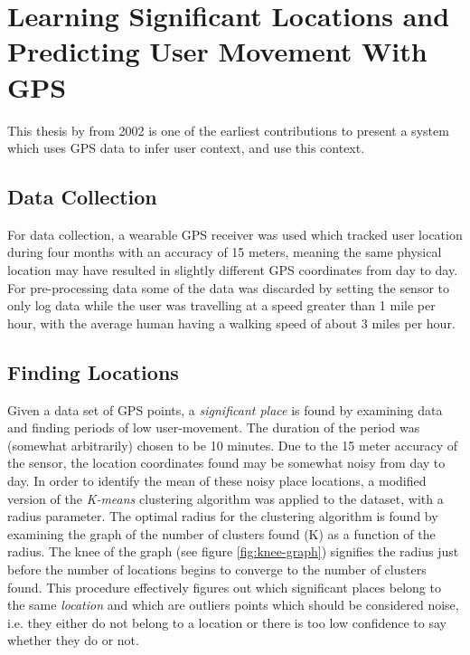 \section{Learning Significant Locations and Predicting User Movement With GPS}
This thesis by \cite{learning_significant_locations} from 2002 is one of the earliest contributions to present a system which uses GPS data to infer user context, and use this context. 

\subsection{Data Collection}
For data collection, a wearable GPS receiver was used which tracked user location during four months with an accuracy of 15 meters, meaning the same physical location may have resulted in slightly different GPS coordinates from day to day. For pre-processing data some of the data was discarded by setting the sensor to only log data while the user was travelling at a speed greater than 1 mile per hour, with the average human having a walking speed of about 3 miles per hour. 

\subsection{Finding Locations}
Given a data set of GPS points, a \textit{significant place} is found by examining data and finding periods of low user-movement. The duration of the period was (somewhat arbitrarily) chosen to be 10 minutes. Due to the 15 meter accuracy of the sensor, the location coordinates found may be somewhat noisy from day to day. In order to identify the mean of these noisy place locations, a modified version of the \textit{K-means} clustering algorithm was applied to the dataset, with a radius parameter. The optimal radius for the clustering algorithm is found by examining  the graph of the number of clusters found (K) as a function of the radius. The knee of the graph (see figure \ref{fig:knee-graph}) signifies the radius just before the number of locations begins to converge to the number of clusters found. This procedure effectively figures out which significant places belong to the same \textit{location} and which are outliers points which should be considered noise, i.e. they either do not belong to a location or there is too low confidence to say whether they do or not. 

